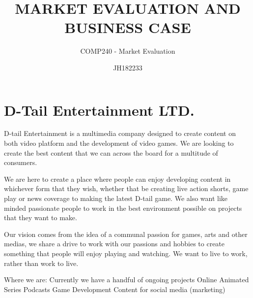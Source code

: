 \documentclass{scrartcl}
\title{MARKET EVALUATION AND BUSINESS CASE}
\subtitle{COMP240 - Market Evaluation}
\author{JH182233}
\begin{document}
	
	
	\maketitle
{}
	
\section{D-Tail Entertainment LTD.}

D-tail Entertainment is a multimedia company designed to create content on both video platform and the development of video games. We are looking to create the best content that we can across the board for a multitude of consumers. 

We are here to create a place where people can enjoy developing content in whichever form that they wish, whether that be creating live action shorts, game play or news coverage to making the latest D-tail game. We also want like minded passionate people to work in the best environment possible on projects that they want to make.

Our vision comes from the idea of a communal passion for games, arts and other medias, we share a drive to work with our passions and hobbies to create something that people will enjoy playing and watching. We want to live to work, rather than work to live. 

Where we are:
Currently we have a handful of ongoing projects 
\newline
Online Animated Series
Podcasts
Game Development
Content for social media (marketing)
\newline
\end{document}
